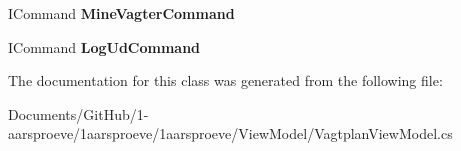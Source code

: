 \begin{DoxyCompactItemize}
\item 
\hypertarget{class__1aarsproeve_1_1_view_model_1_1_vagtplan_view_model_abded4dcbd3699986defbf179b9d52001}{}I\+Command {\bfseries Mine\+Vagter\+Command}\label{class__1aarsproeve_1_1_view_model_1_1_vagtplan_view_model_abded4dcbd3699986defbf179b9d52001}

\item 
\hypertarget{class__1aarsproeve_1_1_view_model_1_1_vagtplan_view_model_aadc2e0233944328d65644e49b449f89b}{}I\+Command {\bfseries Log\+Ud\+Command}\label{class__1aarsproeve_1_1_view_model_1_1_vagtplan_view_model_aadc2e0233944328d65644e49b449f89b}

\end{DoxyCompactItemize}


The documentation for this class was generated from the following file\+:\begin{DoxyCompactItemize}
\item 
Documents/\+Git\+Hub/1-\/aarsproeve/1aarsproeve/1aarsproeve/\+View\+Model/Vagtplan\+View\+Model.\+cs\end{DoxyCompactItemize}
